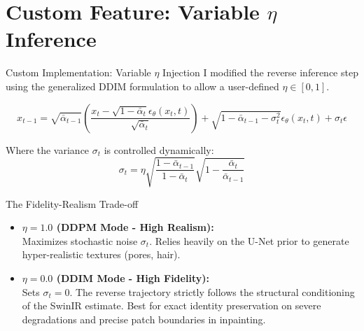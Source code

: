 \documentclass[aspectratio=169]{beamer}
\begin{document}
\section{Custom Feature: Variable $\eta$ Inference}

\begin{frame}{Custom Implementation: Variable $\eta$ Injection}
    I modified the reverse inference step using the generalized DDIM formulation to allow a user-defined $\eta \in [0, 1]$.
    
    \begin{equation}
        x_{t-1} = \sqrt{\bar{\alpha}_{t-1}} \left( \frac{x_t - \sqrt{1-\bar{\alpha}_t}\epsilon_\theta(x_t, t)}{\sqrt{\bar{\alpha}_t}} \right) + \sqrt{1-\bar{\alpha}_{t-1} - \sigma_t^2} \epsilon_\theta(x_t, t) + \sigma_t \epsilon
    \end{equation}
    
    Where the variance $\sigma_t$ is controlled dynamically:
    \begin{equation}
        \sigma_t = \eta \sqrt{\frac{1-\bar{\alpha}_{t-1}}{1-\bar{\alpha}_t}} \sqrt{1 - \frac{\bar{\alpha}_t}{\bar{\alpha}_{t-1}}}
    \end{equation}
\end{frame}

\begin{frame}{The Fidelity-Realism Trade-off}
    \begin{itemize}
        \item \textbf{$\eta = 1.0$ (DDPM Mode - High Realism):} \\
        Maximizes stochastic noise $\sigma_t$. Relies heavily on the U-Net prior to generate hyper-realistic textures (pores, hair).
        
        \vspace{0.2cm}
        \item \textbf{$\eta = 0.0$ (DDIM Mode - High Fidelity):} \\
        Sets $\sigma_t = 0$. The reverse trajectory strictly follows the structural conditioning of the SwinIR estimate. Best for exact identity preservation on severe degradations and precise patch boundaries in inpainting.
    \end{itemize}
\end{frame}

\end{document}
